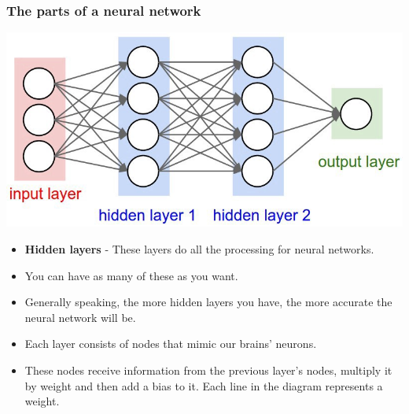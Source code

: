 \documentclass{beamer}
\begin{document}
\begin{frame}
\frametitle{The parts of a neural network}
\centering
\includegraphics[scale=0.2]{partsnn.jpeg}
\begin{itemize}
   
   \item \textbf{Hidden layers} - These layers do all the processing for neural networks. 
   
   \item You can have as many of these as you want. 
   
   \item Generally speaking, the more hidden layers you have, the more accurate the neural network will be. 
   
   \item Each layer consists of nodes that mimic our brains’ neurons.
   
   \item These nodes receive information from the previous layer’s nodes, multiply it by weight and then add a bias to it. Each line in the diagram represents a weight. 
  
   
\end{itemize}

\end{frame}

\end{document}
